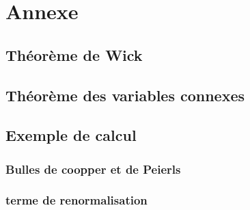 \chapter{Annexe}

\section{Théorème de Wick}

\section{Théorème des variables connexes}

\section{Exemple de calcul}

\subsection{Bulles de  coopper et de Peierls}

\subsection{terme de renormalisation}
